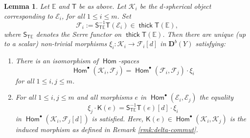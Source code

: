 \documentclass[a4paper,11pt, reqno]{amsart}
\def\E{\mathbb E}
\def\DD{\mathbf D}
\def\sE{\mathscr{E}}
\def\sF{\mathscr{F}}
\def\sK{\mathscr{K}}
\newcommand{\opname}[1]{\operatorname{\mathsf{#1}}}
\newcommand{\Hom}{\opname{Hom}}
\newcommand{\thick}{\opname{thick}\nolimits}
\def\Db{\DD^b}
\newcommand{\bK}{\mathsf{K}}
\newcommand{\bS}{\mathsf{S}}
\newcommand{\bT}{\mathsf{T}}
\theoremstyle{plain}
\newtheorem{lemma}[dummy]{Lemma}
\theoremstyle{definition}
\numberwithin{equation}{section}
\begin{document}
\begin{lemma}\label{lem:hom-K-F}
    Let $\E$ and $\bT$ be as above. 
    Let $\sK_i$ be the $d$-spherical object corresponding to $\sE_i$, for all $1\leq i \leq m$.
    Set
    \[
    \sF_i := \bS^{-1}_{\bT\E}  \bT ( \sE_i ) \in \thick \bT( \E ) ,
    \]
    where $\bS_{\bT\E}$ denotes the Serre functor on $\thick\bT ( \E )$.
    Then there are unique (up to a scalar) non-trivial morphisms $\xi_i \colon \sK_i \to \sF_i [d]$ in $\Db(Y)$ satisfying:
       \begin{enumerate}
          \item\label{lem:hom-K-F-a} There is an isomorphism of $\Hom$-spaces
        \[
        \Hom^\bullet ( \sK_i , \sF_j ) = \Hom^\bullet ( \sF_i , \sF_j  ) \cdot \xi_i 
        \]
        for all $1 \leq i , j \leq m$.
        \item\label{lem:hom-K-F-12} For all $1\leq i , j \leq m$ and all morphisms $e$ in $\Hom^\bullet  ( \sE_i , \sE_j )$ the equality
        \[
        \xi_j \cdot \bK ( e ) = \bS^{-1}_{\bT\E} \bT (e) [d] \cdot \xi_i   
        \]
        in $\Hom^\bullet ( \sK_i , \sF_j [d] )$
        is satisfied.
        Here, $\bK (e) \in \Hom^\bullet ( \sK_i , \sK_j  )$ is the induced morphism as defined in Remark \ref{rmk:delta-commut}.
    \end{enumerate}
\end{lemma}
\end{document}
